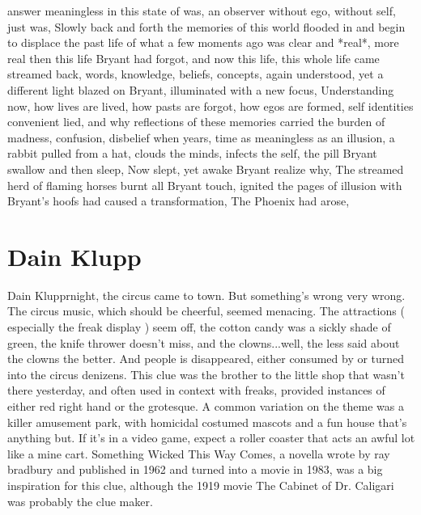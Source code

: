 \documentclass[12pt]{book}
\begin{document}
answer meaningless in this state of was, an observer without ego, without self, just was, Slowly back and forth the memories of this world flooded in and begin to displace the past life of what a few moments ago was clear and *real*, more real then this life Bryant had forgot, and now this life, this whole life came streamed back, words, knowledge, beliefs, concepts, again understood, yet a different light blazed on Bryant, illuminated with a new focus, Understanding now, how lives are lived, how pasts are forgot, how egos are formed, self identities convenient lied, and why reflections of these memories carried the burden of madness, confusion, disbelief when years, time as meaningless as an illusion, a rabbit pulled from a hat, clouds the minds, infects the self, the pill Bryant swallow and then sleep, Now slept, yet awake Bryant realize why, The streamed herd of flaming horses burnt all Bryant touch, ignited the pages of illusion with Bryant's hoofs had caused a transformation, The Phoenix had arose,



\chapter{Dain Klupp}

Dain Klupprnight, the circus came to town. But something's wrong  very wrong. The circus music, which should be cheerful, seemed menacing. The attractions ( especially the freak display ) seem off, the cotton candy was a sickly shade of green, the knife thrower doesn't miss, and the clowns...well, the less said about the clowns the better. And people is disappeared, either consumed by or turned into the circus denizens. This clue was the brother to the little shop that wasn't there yesterday, and often used in context with freaks, provided instances of either red right hand or the grotesque. A common variation on the theme was a killer amusement park, with homicidal costumed mascots and a fun house that's anything but. If it's in a video game, expect a roller coaster that acts an awful lot like a mine cart. Something Wicked This Way Comes, a novella wrote by ray bradbury and published in 1962 and turned into a movie in 1983, was a big inspiration for this clue, although the 1919 movie The Cabinet of Dr. Caligari was probably the clue maker.
\end{document}
